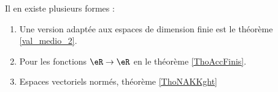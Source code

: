 
    Il en existe plusieurs formes :
    \begin{enumerate}
        \item
            Une version adaptée aux espaces de dimension finie est le théorème \ref{val_medio_2}.
        \item
            Pour les fonctions \( \eR\to \eR\) en le théorème \ref{ThoAccFinis}.
        \item
            Espaces vectoriels normés, théorème \ref{ThoNAKKght}
    \end{enumerate}

